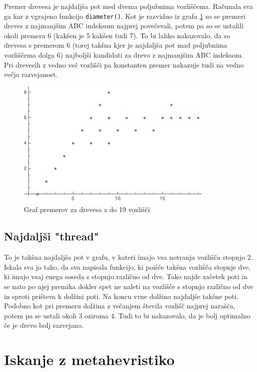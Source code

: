 \documentclass[a4paper,12 pt]{article}
\begin{document}
Premer drevesa je najdaljša pot med dvema poljubnima vozliščema. Računala sva ga kar z vgrajeno funkcijo \texttt{diameter()}. Kot je razvidno iz grafa \ref{fig:premer} so se premeri dreves z najmanjšim ABC indeksom najprej povečevali, potem pa so se ustalili okoli premera 6 (kakšen je 5 kakšen tudi 7). To bi lahko nakazovalo, da so drevesa s premerom 6 (torej takšna kjer je najdaljša pot mad poljubnima vozliščema dolga 6) najboljši kandidati za drevo z najmanjšim ABC indeksom. Pri drevesih z vedno več vozlišči pa konstanten premer nakazuje tudi na vedno večjo razvejanost.
\begin{figure}
  \includegraphics[width=\linewidth]{sirina.jpg}
  \caption{Graf premerov za drevesa z do 19 vozlišči}
  \label{fig:premer}
\end{figure}

\subsection[Najdaljši "thread"]{Najdaljši "thread"}

To je takšna najdaljša pot v grafu, v kateri imajo vsa notranja vozlišča stopnjo 2. Iskala sva jo tako, da sva napisala funkcijo, ki poišče takšna vozlišča stopnje dve, ki imajo vsaj enega soseda s stopnjo različno od dve. Tako najde začetek poti in se nato po njej premika dokler spet ne naleti na vozlišče s stopnjo različno od dve in sproti prišteva k dolžini poti. Na koncu vrne dolžino najdaljše takšne poti. Podobno kot pri premeru dolžina z večanjem števila vozlišč najprej narašča, potem pa se ustali okoli 3 oziroma 4. Tudi to bi nakazovalo, da je bolj optimalno če je drevo bolj razvejano.

\section[Iskanje z metahevristiko]{Iskanje z metahevristiko}
\end{document}
